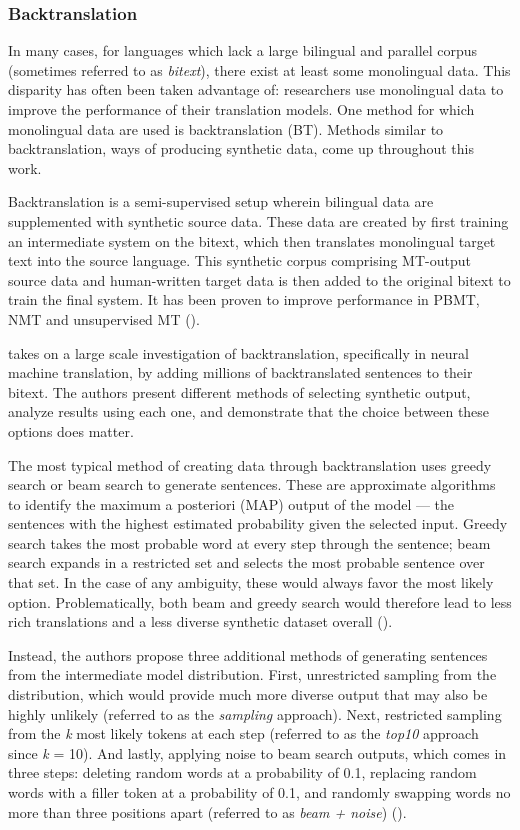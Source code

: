 \subsubsection{Backtranslation}

In many cases, for languages which lack a large bilingual and parallel corpus (sometimes referred to as \textit{bitext}), there exist at least some monolingual data. This disparity has often been taken advantage of: researchers use monolingual data to improve the performance of their translation models. One method for which monolingual data are used is backtranslation (BT). Methods similar to backtranslation, ways of producing synthetic data, come up throughout this work.

Backtranslation is a semi-supervised setup wherein bilingual data are supplemented with synthetic source data. These data are created by first training an intermediate system on the bitext, which then translates monolingual target text into the source language. This synthetic corpus comprising MT-output source data and human-written target data is then added to the original bitext to train the final system. It has been proven to improve performance in PBMT, NMT and unsupervised MT (\cite{edunov2018understanding}).

\cite{edunov2018understanding} takes on a large scale investigation of backtranslation, specifically in neural machine translation, by adding millions of backtranslated sentences to their bitext. The authors present different methods of selecting synthetic output, analyze results using each one, and demonstrate that the choice between these options does matter.

The most typical method of creating data through backtranslation uses greedy search or beam search to generate sentences. These are approximate algorithms to identify the maximum a posteriori (MAP) output of the model --- the sentences with the highest estimated probability given the selected input. Greedy search takes the most probable word at every step through the sentence; beam search expands in a restricted set and selects the most probable sentence over that set. In the case of any ambiguity, these would always favor the most likely option. Problematically, both beam and greedy search would therefore lead to less rich translations and a less diverse synthetic dataset overall (\cite{edunov2018understanding}).

Instead, the authors propose three additional methods of generating sentences from the intermediate model distribution. First, unrestricted sampling from the distribution, which would provide much more diverse output that may also be highly unlikely (referred to as the \textit{sampling} approach). Next, restricted sampling from the \textit{k} most likely tokens at each step (referred to as the \textit{top10} approach since \textit{k} = 10). And lastly, applying noise to beam search outputs, which comes in three steps: deleting random words at a probability of 0.1, replacing random words with a filler token at a probability of 0.1, and randomly swapping words no more than three positions apart (referred to as \textit{beam + noise}) (\cite{edunov2018understanding}).

